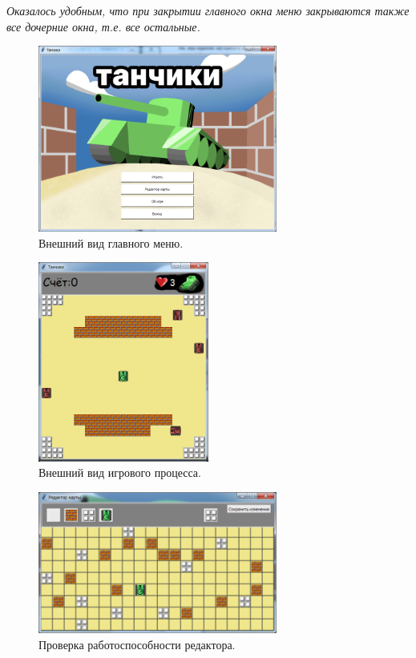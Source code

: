 \textit{Оказалось удобным, что при закрытии главного окна меню закрываются также все дочерние окна, т.е. все остальные.}

\begin{figure}[H]
    \centering
    \includegraphics[width=0.7\textwidth]{./images/image5.png}
    \caption{\centering\label{fig:example05}Внешний вид главного меню.}
\end{figure}

\begin{figure}[H]
    \centering
    \includegraphics[width=0.5\textwidth]{./images/game_process.png}
    \caption{\centering\label{fig:example05}Внешний вид игрового процесса.}
\end{figure}

\begin{figure}[H]
    \centering
    \includegraphics[width=0.7\textwidth]{./images/image4.png}
    \caption{\centering\label{fig:example05}Проверка работоспособности редактора.}
\end{figure}